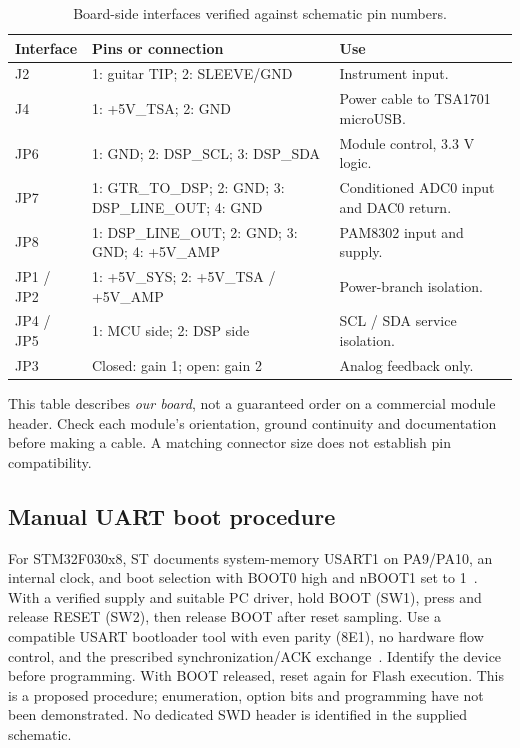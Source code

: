\documentclass[a4paper,10pt]{article}
\begin{document}
\begin{table}[H]\centering\small
\caption{Board-side interfaces verified against schematic pin numbers.}\label{tab:interfaces}
\begin{tabularx}{\linewidth}{P{24mm}P{76mm}Y}\toprule
Interface & Pins or connection & Use\\\midrule
J2 & 1: guitar TIP; 2: SLEEVE/GND & Instrument input.\\
J4 & 1: +5V\_TSA; 2: GND & Power cable to TSA1701 microUSB.\\
JP6 & 1: GND; 2: DSP\_SCL; 3: DSP\_SDA & Module control, 3.3 V logic.\\
JP7 & 1: GTR\_TO\_DSP; 2: GND; 3: DSP\_LINE\_OUT; 4: GND & Conditioned ADC0 input and DAC0 return.\\
JP8 & 1: DSP\_LINE\_OUT; 2: GND; 3: GND; 4: +5V\_AMP & PAM8302 input and supply.\\
JP1 / JP2 & 1: +5V\_SYS; 2: +5V\_TSA / +5V\_AMP & Power-branch isolation.\\
JP4 / JP5 & 1: MCU side; 2: DSP side & SCL / SDA service isolation.\\
JP3 & Closed: gain 1; open: gain 2 & Analog feedback only.\\\bottomrule
\end{tabularx}
\end{table}

This table describes \emph{our board}, not a guaranteed order on a commercial module header. Check each module's orientation, ground continuity and documentation before making a cable. A matching connector size does not establish pin compatibility.

\subsection{Manual UART boot procedure}
For STM32F030x8, ST documents system-memory USART1 on PA9/PA10, an internal clock, and boot selection with BOOT0 high and nBOOT1 set to 1~\cite{an2606}. With a verified supply and suitable PC driver, hold BOOT (SW1), press and release RESET (SW2), then release BOOT after reset sampling. Use a compatible USART bootloader tool with even parity (8E1), no hardware flow control, and the prescribed synchronization/ACK exchange~\cite{an3155}. Identify the device before programming. With BOOT released, reset again for Flash execution. This is a proposed procedure; enumeration, option bits and programming have not been demonstrated. No dedicated SWD header is identified in the supplied schematic.
\end{document}
